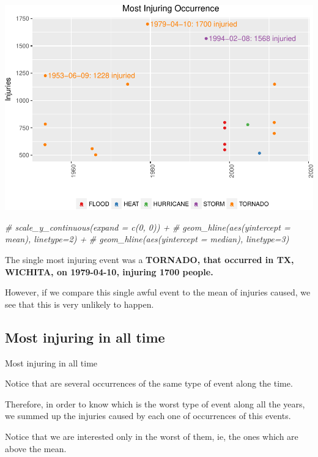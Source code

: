 \documentclass[]{article}
\newenvironment{Shaded}{\begin{snugshade}}{\end{snugshade}}
\newcommand{\CommentTok}[1]{\textcolor[rgb]{0.56,0.35,0.01}{\textit{{#1}}}}
\begin{document}
\includegraphics{readme_files/figure-latex/injuring-single-plot-1.pdf}

\begin{Shaded}
\begin{Highlighting}[]
        \CommentTok{# scale_y_continuous(expand = c(0, 0)) +}
        \CommentTok{# geom_hline(aes(yintercept = mean), linetype=2) +}
        \CommentTok{# geom_hline(aes(yintercept = median), linetype=3)}
\end{Highlighting}
\end{Shaded}

The single most injuring event was a \textbf{TORNADO, that occurred in
TX, WICHITA, on 1979-04-10, injuring 1700 people.}

However, if we compare this single awful event to the mean of injuries
caused, we see that this is very unlikely to happen.

\subsection{Most injuring in all time}\label{most-injuring-in-all-time}

Most injuring in all time

Notice that are several occurrences of the same type of event along the
time.

Therefore, in order to know which is the worst type of event along all
the years, we summed up the injuries caused by each one of occurrences
of this events.

Notice that we are interested only in the worst of them, ie, the ones
which are above the mean.
\end{document}

